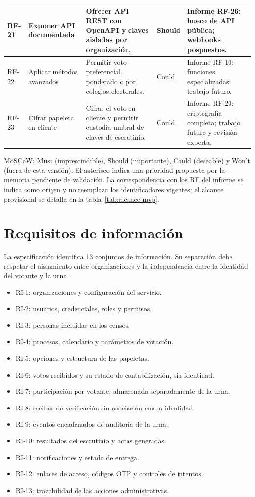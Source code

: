 \begin{longtable}{|p{}|p{}|p{}|p{}|p{}|}
\hline
RF-21 & Exponer API documentada & Ofrecer API REST con OpenAPI y claves aisladas por organización. & Should & Informe RF-26: hueco de API pública; webhooks pospuestos. \\
\hline
RF-22 & Aplicar métodos avanzados & Permitir voto preferencial, ponderado o por colegios electorales. & Could & Informe RF-10: funciones especializadas; trabajo futuro. \\
\hline
RF-23 & Cifrar papeleta en cliente & Cifrar el voto en cliente y permitir custodia umbral de claves de escrutinio. & Could & Informe RF-20: criptografía completa; trabajo futuro y revisión experta. \\
\hline
\end{longtable}
\setlength{\tabcolsep}{6pt}
\normalsize
\noindent\footnotesize MoSCoW: Must (imprescindible), Should (importante),
Could (deseable) y Won't (fuera de esta versión). El asterisco indica una
prioridad propuesta por la memoria pendiente de validación. La correspondencia
con los RF del informe se indica como origen y no reemplaza los identificadores
vigentes; el alcance provisional se detalla en la tabla~\ref{tab:alcance-mvp}.\normalsize

\section{Requisitos de información}
\label{sec:requisitos-informacion}

La especificación identifica 13 conjuntos de información. Su separación debe
respetar el aislamiento entre organizaciones y la independencia entre la
identidad del votante y la urna.

\begin{itemize}
  \item RI-1: organizaciones y configuración del servicio.
  \item RI-2: usuarios, credenciales, roles y permisos.
  \item RI-3: personas incluidas en los censos.
  \item RI-4: procesos, calendario y parámetros de votación.
  \item RI-5: opciones y estructura de las papeletas.
  \item RI-6: votos recibidos y su estado de contabilización, sin identidad.
  \item RI-7: participación por votante, almacenada separadamente de la urna.
  \item RI-8: recibos de verificación sin asociación con la identidad.
  \item RI-9: eventos encadenados de auditoría de la urna.
  \item RI-10: resultados del escrutinio y actas generadas.
  \item RI-11: notificaciones y estado de entrega.
  \item RI-12: enlaces de acceso, códigos OTP y controles de intentos.
  \item RI-13: trazabilidad de las acciones administrativas.
\end{itemize}

